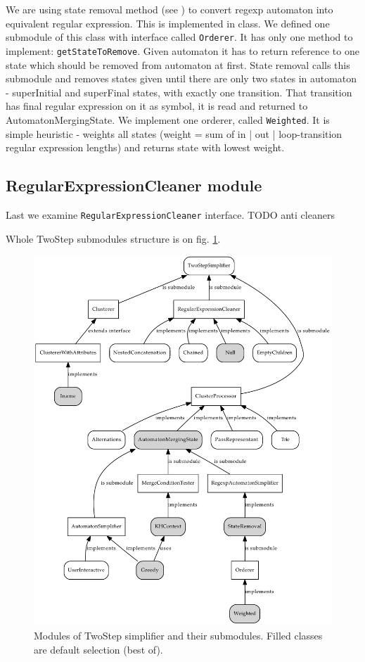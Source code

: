 \documentclass[a4paper,10pt,oneside]{article}
\newcommand{\myscale}{0.74}
\newcommand{\code}[1]{\texttt{#1}}
\begin{document}
We are using state removal method (see \cite{1224321}) to convert regexp automaton into equivalent regular expression.
This is implemented in  class.
We defined one submodule of this class with interface called \code{Orderer}.
It has only one method to implement: \code{getStateToRemove}.
Given automaton it has to return reference to one state which should be removed from automaton at first.
State removal calls this submodule and removes states given until there are only two states in automaton - superInitial and superFinal states,
with exactly one transition.
That transition has final regular expression on it as symbol, it is read and returned to AutomatonMergingState.
We implement one orderer, called \code{Weighted}.
It is simple heuristic - weights all states (weight = sum of {in | out | loop}-transition regular expression lengths) and returns state with lowest weight.

\subsection{RegularExpressionCleaner module}
Last we examine \code{RegularExpressionCleaner} interface.
TODO anti cleaners


Whole TwoStep submodules structure is on fig. \ref{twostep_modules_complete}.
\begin{figure}
	\centering\includegraphics[scale=\myscale]{twostep_modules_complete}
	\caption{Modules of TwoStep simplifier and their submodules. Filled classes are default selection (best of).} \label{twostep_modules_complete}
\end{figure}

\nocite{*}


\end{document}
